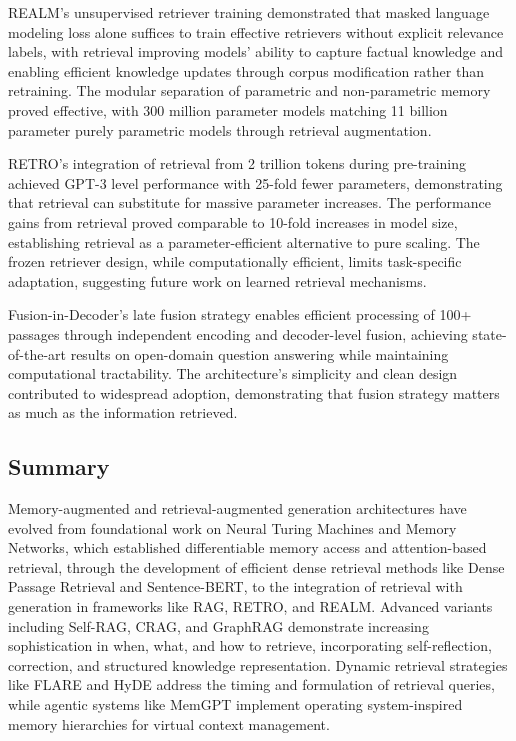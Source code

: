 REALM's unsupervised retriever training demonstrated that masked language modeling loss alone suffices to train effective retrievers without explicit relevance labels, with retrieval improving models' ability to capture factual knowledge and enabling efficient knowledge updates through corpus modification rather than retraining. The modular separation of parametric and non-parametric memory proved effective, with 300 million parameter models matching 11 billion parameter purely parametric models through retrieval augmentation.

RETRO's integration of retrieval from 2 trillion tokens during pre-training achieved GPT-3 level performance with 25-fold fewer parameters, demonstrating that retrieval can substitute for massive parameter increases. The performance gains from retrieval proved comparable to 10-fold increases in model size, establishing retrieval as a parameter-efficient alternative to pure scaling. The frozen retriever design, while computationally efficient, limits task-specific adaptation, suggesting future work on learned retrieval mechanisms.

Fusion-in-Decoder's late fusion strategy enables efficient processing of 100+ passages through independent encoding and decoder-level fusion, achieving state-of-the-art results on open-domain question answering while maintaining computational tractability. The architecture's simplicity and clean design contributed to widespread adoption, demonstrating that fusion strategy matters as much as the information retrieved.

\subsection{Summary}

Memory-augmented and retrieval-augmented generation architectures have evolved from foundational work on Neural Turing Machines and Memory Networks, which established differentiable memory access and attention-based retrieval, through the development of efficient dense retrieval methods like Dense Passage Retrieval and Sentence-BERT, to the integration of retrieval with generation in frameworks like RAG, RETRO, and REALM. Advanced variants including Self-RAG, CRAG, and GraphRAG demonstrate increasing sophistication in when, what, and how to retrieve, incorporating self-reflection, correction, and structured knowledge representation. Dynamic retrieval strategies like FLARE and HyDE address the timing and formulation of retrieval queries, while agentic systems like MemGPT implement operating system-inspired memory hierarchies for virtual context management.

